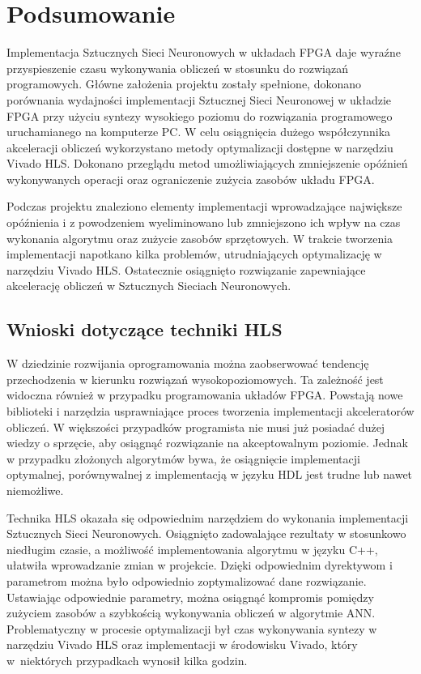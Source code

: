 \newpage %
\cleardoublepage %
\pagestyle{headings}

\section{Podsumowanie}

Implementacja Sztucznych Sieci Neuronowych w układach FPGA daje wyraźne przyspieszenie czasu wykonywania obliczeń w stosunku do rozwiązań programowych. Główne założenia projektu zostały spełnione, dokonano porównania wydajności implementacji Sztucznej Sieci Neuronowej w układzie FPGA przy użyciu syntezy wysokiego poziomu do rozwiązania programowego uruchamianego na komputerze PC. W celu osiągnięcia dużego współczynnika akceleracji obliczeń wykorzystano metody optymalizacji dostępne w narzędziu Vivado HLS. Dokonano przeglądu metod umożliwiających zmniejszenie opóźnień wykonywanych operacji oraz ograniczenie zużycia zasobów układu FPGA.

Podczas projektu znaleziono elementy implementacji wprowadzające największe opóźnienia i z powodzeniem wyeliminowano lub zmniejszono ich wpływ na czas wykonania algorytmu oraz zużycie zasobów sprzętowych. W trakcie tworzenia implementacji napotkano kilka problemów, utrudniających optymalizację w narzędziu Vivado HLS. Ostatecznie osiągnięto rozwiązanie zapewniające akcelerację obliczeń w Sztucznych Sieciach Neuronowych. 


\subsection{Wnioski dotyczące techniki HLS}
W dziedzinie rozwijania oprogramowania można zaobserwować tendencję przechodzenia w kierunku rozwiązań wysokopoziomowych. Ta zależność jest widoczna również w przypadku programowania układów FPGA. Powstają nowe biblioteki i narzędzia usprawniające proces tworzenia implementacji akceleratorów obliczeń. W większości przypadków programista nie musi już posiadać dużej wiedzy o sprzęcie, aby osiągnąć rozwiązanie na akceptowalnym poziomie. Jednak w przypadku złożonych algorytmów bywa, że osiągnięcie implementacji optymalnej, porównywalnej z implementacją w języku HDL jest trudne lub nawet niemożliwe.

Technika HLS okazała się odpowiednim narzędziem do wykonania implementacji Sztucznych Sieci Neuronowych. Osiągnięto zadowalające rezultaty w stosunkowo niedługim czasie, a możliwość implementowania algorytmu w języku C++, ułatwiła wprowadzanie zmian w projekcie. Dzięki odpowiednim dyrektywom i parametrom można było odpowiednio zoptymalizować dane rozwiązanie. Ustawiając odpowiednie parametry, można osiągnąć kompromis pomiędzy zużyciem zasobów a szybkością wykonywania obliczeń w algorytmie ANN. Problematyczny w procesie optymalizacji był czas wykonywania syntezy w narzędziu Vivado HLS oraz implementacji w środowisku Vivado, który w~niektórych przypadkach wynosił kilka godzin. 

